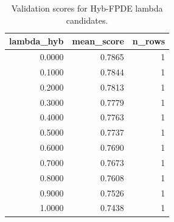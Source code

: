 \begin{table}[t]
\caption{Validation scores for Hyb-FPDE lambda candidates.}
\label{tab:lambda_distribution_computed}
\centering
\begin{tabular}{rrr}
\toprule
lambda\_hyb & mean\_score & n\_rows \\
\midrule
0.0000 & 0.7865 & 1 \\
0.1000 & 0.7844 & 1 \\
0.2000 & 0.7813 & 1 \\
0.3000 & 0.7779 & 1 \\
0.4000 & 0.7763 & 1 \\
0.5000 & 0.7737 & 1 \\
0.6000 & 0.7690 & 1 \\
0.7000 & 0.7673 & 1 \\
0.8000 & 0.7608 & 1 \\
0.9000 & 0.7526 & 1 \\
1.0000 & 0.7438 & 1 \\
\bottomrule
\end{tabular}

\end{table}
